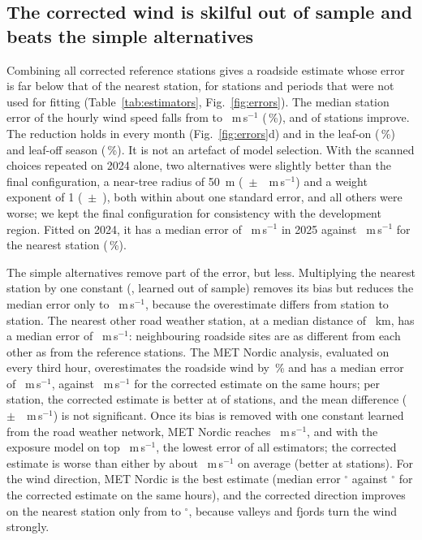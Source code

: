 \subsection{The corrected wind is skilful out of sample and beats the simple alternatives}
\label{sec:res-skill}
Combining all corrected reference stations gives a roadside estimate whose error is far below that of the nearest station, for stations and periods that were not used for fitting (Table~\ref{tab:estimators}, Fig.~\ref{fig:errors}). The median station error of the hourly wind speed falls from \noCvRaw{} to \noCvMed~m\,s$^{-1}$ (\noCvRed\,\%), and \noCvBetter{} of \noTrv{} stations improve. The reduction holds in every month (Fig.~\ref{fig:errors}d) and in the leaf-on (\noOnRed\,\%) and leaf-off season (\noOffRed\,\%). It is not an artefact of model selection. With the scanned choices repeated on 2024 alone, two alternatives were slightly better than the final configuration, a near-tree radius of \SI{50}{m} (\noSelTreeD~$\pm$~\noSelTreeSE~m\,s$^{-1}$) and a weight exponent of 1 (\noSelPowD~$\pm$~\noSelPowSE), both within about one standard error, and all others were worse; we kept the final configuration for consistency with the development region. Fitted on 2024, it has a median error of \noHoldMed~m\,s$^{-1}$ in 2025 against \noHoldRaw~m\,s$^{-1}$ for the nearest station (\noHoldRed\,\%).

The simple alternatives remove part of the error, but less. Multiplying the nearest station by one constant (\noRescConst, learned out of sample) removes its bias but reduces the median error only to \noSpdResc~m\,s$^{-1}$, because the overestimate differs from station to station. The nearest other road weather station, at a median distance of \noRoadKm~km, has a median error of \noSpdRoad~m\,s$^{-1}$: neighbouring roadside sites are as different from each other as from the reference stations. The MET Nordic analysis, evaluated on every third hour, overestimates the roadside wind by \noSpdBiasMnhMn\,\% and has a median error of \noSpdMnhMn~m\,s$^{-1}$, against \noSpdMnhCor~m\,s$^{-1}$ for the corrected estimate on the same hours; per station, the corrected estimate is better at \noPairCorMnBetter{} of \noTrv{} stations, and the mean difference (\noPairCorMn~$\pm$~\noPairCorMnSE~m\,s$^{-1}$) is not significant. Once its bias is removed with one constant learned from the road weather network, MET Nordic reaches \noSpdMnhMnResc~m\,s$^{-1}$, and with the exposure model on top \noSpdMnhMnExp~m\,s$^{-1}$, the lowest error of all estimators; the corrected estimate is worse than either by about \noPairCorMnExp~m\,s$^{-1}$ on average (better at \noPairCorMnExpBetter{} stations). For the wind direction, MET Nordic is the best estimate (median error \noDirMnhMn$^\circ$ against \noDirMnhCor$^\circ$ for the corrected estimate on the same hours), and the corrected direction improves on the nearest station only from \noDirRaw{} to \noDirCor$^\circ$, because valleys and fjords turn the wind strongly.

